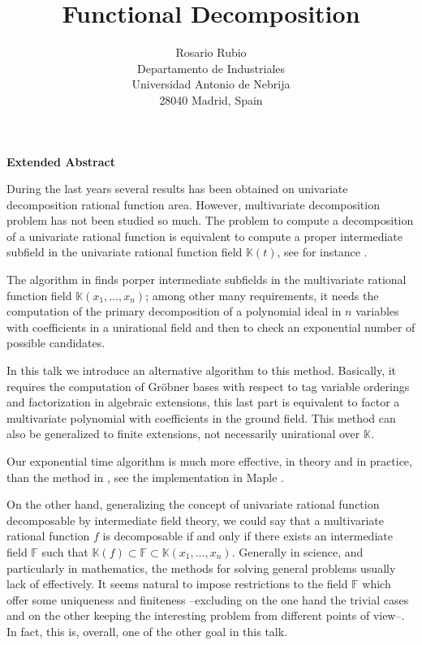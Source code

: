 \documentclass[12pt]{article}
\title{\bf Functional Decomposition}
\author{Rosario Rubio\\
Departamento de Industriales \\
Universidad Antonio de Nebrija\\
 28040 Madrid, Spain
}
\date{}
\newcommand{\K}{\mathbb K}
\newcommand{\F}{\mathbb F}
\begin{document}
\maketitle

{\centerline {\bf Extended Abstract}}\bigskip


During the last years several results has been obtained on
 univariate  decomposition rational function  area.
However, multivariate decomposition problem has not been studied so
much.  The
problem to compute a decomposition of a univariate rational function
is equivalent to compute a proper intermediate subfield in the univariate
rational function field $\K(t)$,
 see for instance
\cite{AGR,zip}.

\medskip



 The algorithm in
\cite{MS}  finds porper intermediate subfields in the multivariate
rational function  field $\K(x_1,\dots,x_n) $;
 among other many requirements,
it needs the computation of the primary decomposition of a
polynomial ideal in
 $n$ variables with coefficients in a unirational field and then to check an
exponential number of possible candidates. \par

  In this talk we introduce an alternative algorithm
to this method.
 Basically, it requires
the computation of  Gr\"obner bases  with respect to tag variable orderings
and factorization in algebraic extensions, this last part is equivalent
to factor a multivariate polynomial  with coefficients in the ground field.
 This method can also be   generalized  to
finite extensions, not necessarily unirational over $\K $. \par

 Our exponential time algorithm is much more  effective, in
theory  and in  practice, than the method in
\cite{MS}, see the implementation in Maple \cite{mitesis}.
\medskip

On the other hand, generalizing the concept of univariate rational function
decomposable by
intermediate field theory, we could say that a multivariate rational
function $f$ is
decomposable if and only if there exists an intermediate field $\F$ such that
$\K(f)\subset\F\subset\K(x_1,\dots,x_n)$.
 Generally in   science, and  particularly in
mathematics, the methods for solving general
problems
 usually lack of effectively.  It seems natural
to impose restrictions to the field $\F $ which offer some
 uniqueness and finiteness --excluding on the one hand the trivial cases
and   on the other keeping the interesting problem
from different points of view--. In fact, this is, overall, one of the
other goal
in this talk. \medskip
\end{document}
